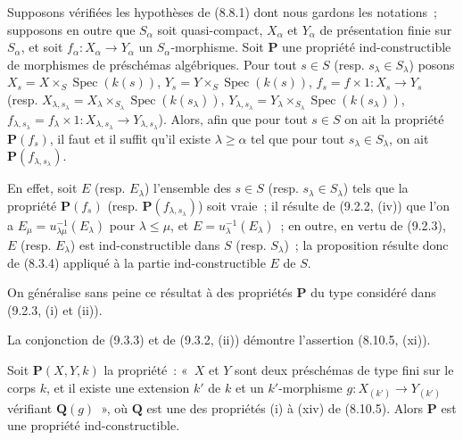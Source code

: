 \begin{proposition}[9.3.3]
\label{IV.9.3.3-fr}
Supposons vérifiées les hypothèses de (8.8.1) dont nous gardons les
notations~; supposons en outre que $S_\alpha$ soit quasi-compact, $X_\alpha$
et $Y_\alpha$ de présentation finie sur $S_\alpha$, et soit
$f_\alpha:X_\alpha\to Y_\alpha$ un $S_\alpha$-morphisme. Soit $\mathbf P$ une
propriété ind-constructible de morphismes de préschémas algébriques. Pour tout
$s\in S$ (resp. $s_\lambda\in S_\lambda$) posons
$X_s=X\times_S\operatorname{Spec}(k(s))$,
$Y_s=Y\times_S\operatorname{Spec}(k(s))$,
$f_s=f\times1:X_s\to Y_s$ (resp.
$X_{\lambda,s_\lambda}=X_\lambda\times_{S_\lambda}
\operatorname{Spec}(k(s_\lambda))$,
$Y_{\lambda,s_\lambda}=Y_\lambda\times_{S_\lambda}
\operatorname{Spec}(k(s_\lambda))$,
$f_{\lambda,s_\lambda}=f_\lambda\times1:
X_{\lambda,s_\lambda}\to Y_{\lambda,s_\lambda}$). Alors, afin que pour
tout $s\in S$ on ait la propriété $\mathbf P(f_s)$, il faut et il suffit
qu'il existe $\lambda\geqslant\alpha$ tel que pour tout
$s_\lambda\in S_\lambda$, on ait $\mathbf P(f_{\lambda,s_\lambda})$.
\end{proposition}

En effet, soit $E$ (resp. $E_\lambda$) l'ensemble des $s\in S$ (resp.
$s_\lambda\in S_\lambda$) tels que la propriété $\mathbf P(f_s)$ (resp.
$\mathbf P(f_{\lambda,s_\lambda})$) soit vraie~; il résulte de
(9.2.2, (iv)) que l'on a
$E_\mu=u_{\lambda\mu}^{-1}(E_\lambda)$ pour $\lambda\leqslant\mu$, et
$E=u_\lambda^{-1}(E_\lambda)$~; en outre, en vertu de (9.2.3), $E$ (resp.
$E_\lambda$) est ind-constructible dans $S$ (resp. $S_\lambda$)~; la
proposition résulte donc de (8.3.4) appliqué à la partie ind-constructible
$E$ de $S$.

On généralise sans peine ce résultat à des propriétés $\mathbf P$ du type
considéré dans (9.2.3, (i) et (ii)).

\begin{remark}[9.3.4]
\label{IV.9.3.4-fr}
La conjonction de (9.3.3) et de (9.3.2, (ii)) démontre l'assertion
(8.10.5, (xi)).
\end{remark}

\begin{proposition}[9.3.5]
\label{IV.9.3.5-fr}
Soit $\mathbf P(X,Y,k)$ la propriété~: «~$X$ et $Y$ sont deux préschémas de
type fini sur le corps $k$, et il existe une extension $k'$ de $k$ et un
$k'$-morphisme $g:X_{(k')}\to Y_{(k')}$ vérifiant $\mathbf Q(g)$~», où
$\mathbf Q$ est une des propriétés (i) à (xiv) de (8.10.5). Alors $\mathbf P$
est une propriété ind-constructible.
\end{proposition}

